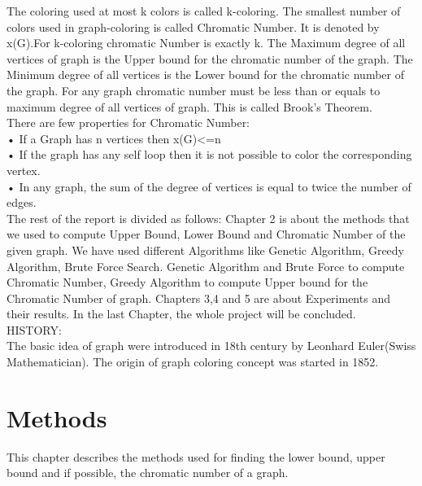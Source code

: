 \documentclass[a4paper]{report}
\begin{document}
	The coloring used at most k colors is called k-coloring. The smallest number of colors used in graph-coloring is called Chromatic Number. It is denoted by x(G).For k-coloring chromatic Number is exactly k. The Maximum degree of all vertices of graph is the Upper bound for the chromatic number of the graph. The Minimum degree of all vertices is the Lower bound for the chromatic number of the graph. For any graph chromatic number must be less than or equals to maximum degree of all vertices of graph. This is called Brook's Theorem. 
\\
	
	
	There are few properties for Chromatic Number:
\\
	•	If a Graph has n vertices then x(G)<=n
\\
	•	If the graph has any self loop then it is not possible to color the corresponding vertex.
\\
	•	In any graph, the sum of the degree of vertices is equal to twice the number of edges.
\\
	
	
	The rest of the report is divided as follows: Chapter 2 is about the methods that we used to compute  Upper Bound, Lower Bound and Chromatic Number of the given graph. We have used different Algorithms like Genetic Algorithm, Greedy Algorithm, Brute  Force Search. Genetic Algorithm and Brute Force  to compute Chromatic Number, Greedy Algorithm to compute Upper bound for the Chromatic Number of graph.  Chapters 3,4 and 5 are about Experiments and their results. In the last Chapter, the whole project will be concluded.
\\
	
	
	
	HISTORY: 
\\
	The basic idea of graph were introduced in 18th century by Leonhard Euler(Swiss Mathematician). The origin of graph coloring concept was started in 1852.
	

	
	\chapter{Methods}
	This chapter describes the methods used for finding the lower bound, upper bound and if possible, the chromatic number of a graph. 
\end{document}
